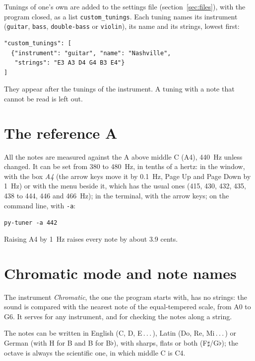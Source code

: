 \documentclass[12pt,
              article,
              oneside
              ]{memoir}
\newcommand*{\elipsis}{\,.\,.\,.\,}
\renewenvironment{quote}%
 {\begin{list}{}%
              {\setlength\rightmargin{0pt}%
              \setlength\leftmargin{\parindent}}%
  \item[]\small\ignorespaces}
 {\unskip\end{list}}
\newcommand*{\menu}[1]{\textit{#1}}
\begin{document}
%
\label{sec:own-tunings}
Tunings of one's own are added to the settings file
(section~\ref{sec:files}), with the program closed, as a list
\texttt{custom\_tunings}. Each tuning names its instrument
(\texttt{guitar}, \texttt{bass}, \texttt{double-bass} or
\texttt{violin}), its name and its strings, lowest first:

\begin{verbatim}
"custom_tunings": [
  {"instrument": "guitar", "name": "Nashville",
   "strings": "E3 A3 D4 G4 B3 E4"}
]
\end{verbatim}

\noindent They appear after the tunings of the instrument. A tuning with a
note that cannot be read is left out.

\section{The reference A}
\label{sec:a4}

%
All the notes are measured against the A above middle C (A4), 440~Hz
unless changed. It can be set from 380 to 480~Hz, in tenths of a hertz: in
the window, with the box \menu{A4} (the arrow keys move it by 0.1~Hz, Page
Up and Page Down by 1~Hz) or with the menu beside it, which has the usual
ones (415, 430, 432, 435, 438 to 444, 446 and 466~Hz); in the terminal, with
the arrow keys; on the command line, with \texttt{-a}:

\begin{quote}
\texttt{py-tuner -a 442}
\end{quote}

\noindent Raising A4 by 1~Hz raises every note by about 3.9 cents.

\section{Chromatic mode and note names}
\label{sec:chromatic}

%
The instrument \menu{Chromatic}, the one the program starts with, has no
strings: the sound is compared with the nearest note of the equal-tempered
scale, from A0 to G6. It serves for
any instrument, and for checking the notes along a string.

%
The notes can be written in English (C, D, E\elipsis), Latin (Do, Re,
Mi\elipsis) or German (with H for B and B for B$\flat$), with sharps,
flats or both (F$\sharp$/G$\flat$); the octave is always the scientific
one, in which middle C is C4.
\end{document}
